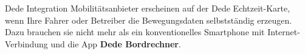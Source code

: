 
\begin{frame}{Dede Integration}
  Mobilitätsanbieter erscheinen auf der Dede Echtzeit-Karte, wenn Ihre Fahrer oder Betreiber die Bewegungsdaten selbstständig erzeugen. Dazu brauchen sie nicht mehr als ein konventionelles Smartphone mit Internet-Verbindung und die App \textbf{Dede Bordrechner}.
\end{frame}
